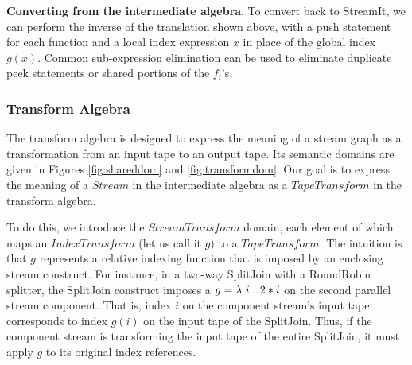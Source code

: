 {\bf Converting from the intermediate algebra}.  To convert back to
StreamIt, we can perform the inverse of the translation shown above,
with a push statement for each function and a local index expression
$x$ in place of the global index $g(x)$.  Common sub-expression
elimination can be used to eliminate duplicate peek statements or
shared portions of the $f_i$'s.

\subsubsection{Transform Algebra}

The transform algebra is designed to express the meaning of a stream
graph as a transformation from an input tape to an output tape.  Its
semantic domains are given in Figures \ref{fig:shareddom} and
\ref{fig:transformdom}.  Our goal is to express the meaning of a
$Stream$ in the intermediate algebra as a $TapeTransform$ in the
transform algebra.  

To do this, we introduce the $StreamTransform$ domain, each element of
which maps an $IndexTransform$ (let us call it $g$) to a
$TapeTransform$.  The intuition is that $g$ represents a relative
indexing function that is imposed by an enclosing stream construct.
For instance, in a two-way SplitJoin with a RoundRobin splitter, the
SplitJoin construct imposes a $g = \lambda~i~.~2*i$ on the second parallel
stream component.  That is, index $i$ on the component stream's input
tape corresponds to index $g(i)$ on the input tape of the SplitJoin.
Thus, if the component stream is transforming the input tape of the
entire SplitJoin, it must apply $g$ to its original index references.

